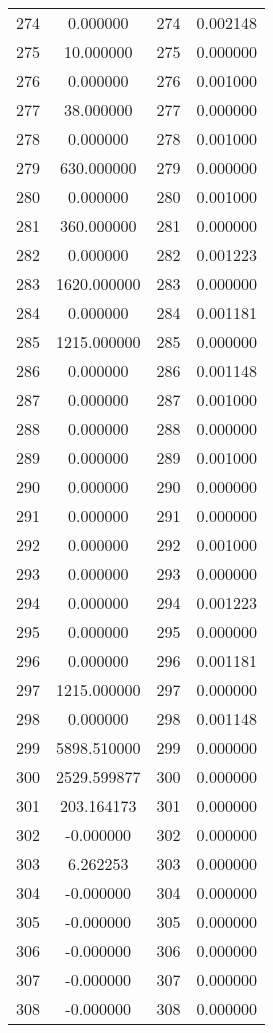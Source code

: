 \documentclass[12pt]{article}
\begin{document}
\begin{longtable}{@{}cccc@{}}
274 & 0.000000 & 274 & 0.002148 \\
275 & 10.000000 & 275 & 0.000000 \\
276 & 0.000000 & 276 & 0.001000 \\
277 & 38.000000 & 277 & 0.000000 \\
278 & 0.000000 & 278 & 0.001000 \\
279 & 630.000000 & 279 & 0.000000 \\
280 & 0.000000 & 280 & 0.001000 \\
281 & 360.000000 & 281 & 0.000000 \\
282 & 0.000000 & 282 & 0.001223 \\
283 & 1620.000000 & 283 & 0.000000 \\
284 & 0.000000 & 284 & 0.001181 \\
285 & 1215.000000 & 285 & 0.000000 \\
286 & 0.000000 & 286 & 0.001148 \\
287 & 0.000000 & 287 & 0.001000 \\
288 & 0.000000 & 288 & 0.000000 \\
289 & 0.000000 & 289 & 0.001000 \\
290 & 0.000000 & 290 & 0.000000 \\
291 & 0.000000 & 291 & 0.000000 \\
292 & 0.000000 & 292 & 0.001000 \\
293 & 0.000000 & 293 & 0.000000 \\
294 & 0.000000 & 294 & 0.001223 \\
295 & 0.000000 & 295 & 0.000000 \\
296 & 0.000000 & 296 & 0.001181 \\
297 & 1215.000000 & 297 & 0.000000 \\
298 & 0.000000 & 298 & 0.001148 \\
299 & 5898.510000 & 299 & 0.000000 \\
300 & 2529.599877 & 300 & 0.000000 \\
301 & 203.164173 & 301 & 0.000000 \\
302 & -0.000000 & 302 & 0.000000 \\
303 & 6.262253 & 303 & 0.000000 \\
304 & -0.000000 & 304 & 0.000000 \\
305 & -0.000000 & 305 & 0.000000 \\
306 & -0.000000 & 306 & 0.000000 \\
307 & -0.000000 & 307 & 0.000000 \\
308 & -0.000000 & 308 & 0.000000 \\

\end{longtable}
\end{document}
